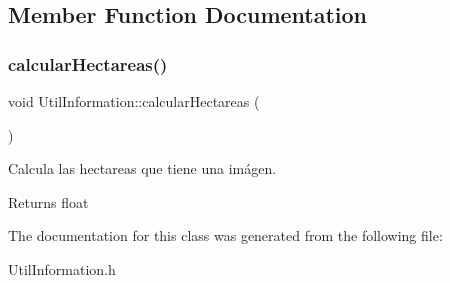 \subsection{Member Function Documentation}
\mbox{\label{classUtilInformation_a47f1a60e6815a3b1642a3324c476fb32}} 
\subsubsection{\texorpdfstring{calcular\+Hectareas()}{calcularHectareas()}}
{\footnotesize\ttfamily void Util\+Information\+::calcular\+Hectareas (\begin{DoxyParamCaption}{ }\end{DoxyParamCaption})\hspace{0.3cm}{\ttfamily [inline]}}



Calcula las hectareas que tiene una imágen. 

\begin{DoxyReturn}{Returns}
float 
\end{DoxyReturn}


The documentation for this class was generated from the following file\+:\begin{DoxyCompactItemize}
\item 
Util\+Information.\+h\end{DoxyCompactItemize}
